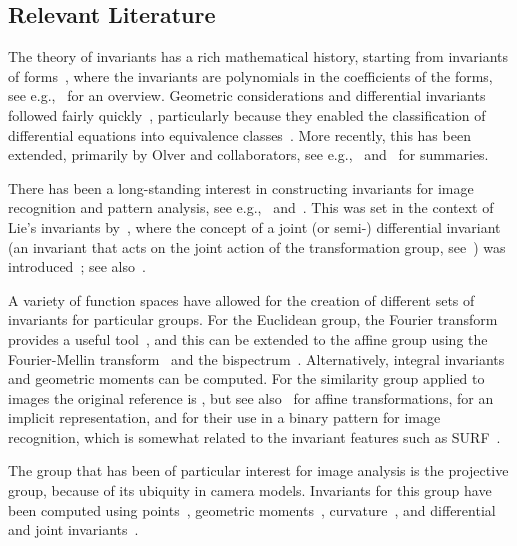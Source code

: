 \documentclass[review,onefignum,onetabnum]{siamonline190516}
\begin{document}
\subsection{Relevant Literature}

The theory of invariants has a rich mathematical history, starting from invariants of forms~\citep{Cayley}, where the invariants are polynomials in the coefficients of the forms, see e.g.,~\citet{OlverCIT,Kraft2002} for an overview. Geometric considerations and differential invariants followed fairly quickly~\citep{Veblen1872,Tresse1894,Bouton1898,Patterson1928}, particularly because they enabled the classification of differential equations into equivalence classes~\citep{Lie1884,Littlewood44, Cartan52}. More recently, this has been extended, primarily by Olver and collaborators, see e.g.,~\citet{OlverCIT} and~\citet{OlverEIS} for summaries.

There has been a long-standing interest in constructing invariants for image recognition and pattern analysis, see e.g.,~\citet{Mundy1992} and~\citet{Wood1996}. This was set in the context of Lie's invariants by~\citet{VanGool1995}, where the concept of a joint (or semi-) differential invariant (an invariant that acts on the joint action of the transformation group, see~\citet{Fels1997,Olver2013}) was introduced~\citep{VanGool1992}; see also~\citet{Hubert2009}. 

A variety of function spaces have allowed for the creation of different sets of invariants for particular groups. For the Euclidean group, the Fourier transform provides a useful tool~\citep{Ghorbel1994,Turski2006,Smach2007,Gauthier2008}, and this can be extended to the affine group using the Fourier-Mellin transform~\citep{Reddy1996,Zhang2019} and the bispectrum~\citep{Kakarala2009,Negrinho2013}. Alternatively, integral invariants~\citep{Manay2006,Feng2010} and geometric moments can be computed. For the similarity group applied to images the original reference is \citet{Hu1962}, but see also~\citet{Hickman2011} for affine transformations, \citet{Flusser2009} for an implicit representation, and \citet{Papakostas2013} for their use in a binary pattern for image recognition, which is somewhat related to the invariant features such as SURF~\citep{SURF}.

The group that has been of particular interest for image analysis is the projective group, because of its ubiquity in camera models. Invariants for this group have been computed using points~\citep{Gros1992,Suk2000}, geometric moments~\citep{Suk2004}, curvature~\citep{Hann2002a}, and differential and joint invariants~\citep{Hubert2007,Arora2009,Kogan2014,Li19}.
\end{document}

